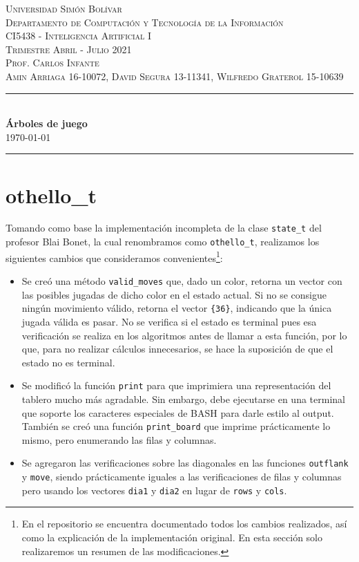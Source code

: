 \documentclass[a4paper,10pt]{article}
\date{}
\newcommand{\HRule}{\rule{\linewidth}{0.5mm}}
\begin{document}
\begin{center}
  \textsc {
    Universidad Simón Bolívar \\[0cm]
    Departamento de Computaci\'on y Tecnolog\'ia de la Informaci\'on \\[0cm]
    CI5438 - Inteligencia Artificial I \\[0cm]
    Trimestre Abril - Julio 2021 \\[0cm]
    Prof. Carlos Infante \\[0cm]
    Amin Arriaga 16-10072, David Segura 13-11341, Wilfredo Graterol 15-10639
  }
  \HRule \\[0.4cm]
  {\Large \textbf{\'Arboles de juego}} \\[0.4cm]
  \textsc{
    \today
  }
  \HRule
\end{center}

\section*{othello\_t}
  Tomando como base la implementaci\'on incompleta de la clase \verb|state_t| del 
  profesor Blai Bonet, la cual renombramos como \verb|othello_t|, realizamos los 
  siguientes cambios que consideramos convenientes\footnote{En el repositorio se
  encuentra documentado todos los cambios realizados, as\'i como la explicaci\'on 
  de la implementaci\'on original. En esta secci\'on solo realizaremos un resumen 
  de las modificaciones.}:

  \begin{itemize}
    \item Se cre\'o una m\'etodo \verb|valid_moves| que, dado un color, retorna 
    un vector con las posibles jugadas de dicho color en el estado actual. Si no 
    se consigue ning\'un movimiento v\'alido, retorna el vector \verb|{36}|,  
    indicando que la \'unica jugada v\'alida es pasar. No se verifica si el estado 
    es terminal pues esa verificaci\'on se realiza en los algoritmos antes de 
    llamar a esta funci\'on, por lo que, para no realizar c\'alculos innecesarios,
    se hace la suposici\'on de que el estado no es terminal.

    \item Se modific\'o la funci\'on \verb|print| para que imprimiera una 
    representaci\'on del tablero mucho m\'as agradable. Sin embargo, debe ejecutarse 
    en una terminal que soporte los caracteres especiales de BASH para darle estilo
    al output. Tambi\'en se cre\'o una funci\'on \verb|print_board| que imprime 
    pr\'acticamente lo mismo, pero enumerando las filas y columnas.

    \item Se agregaron las verificaciones sobre las diagonales en las funciones 
    \verb|outflank| y \verb|move|, siendo pr\'acticamente iguales a las verificaciones
    de filas y columnas pero usando los vectores \verb|dia1| y \verb|dia2| en lugar 
    de \verb|rows| y \verb|cols|.
  \end{itemize}
\end{document}
